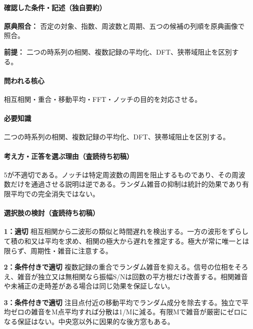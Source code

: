 \paragraph{確認した条件・記述（独自要約）}\mbox{}\par

\noindent\textbf{原典照合：} 否定の対象、指数、周波数と周期、五つの候補の列順を原典画像で照合。\par

\noindent\textbf{前提：} 二つの時系列の相関、複数記録の平均化、DFT、狭帯域阻止を区別する。\par

\paragraph{問われる核心} 相互相関・重合・移動平均・FFT・ノッチの目的を対応させる。

\paragraph{必要知識} 二つの時系列の相関、複数記録の平均化、DFT、狭帯域阻止を区別する。

\paragraph{考え方・正答を選ぶ理由（査読待ち初稿）} 5が不適切である。ノッチは特定周波数の周囲を阻止するものであり、その周波数だけを通過させる説明は逆である。ランダム雑音の抑制は統計的効果であり有限平均での完全消失ではない。

\paragraph{選択肢の検討（査読待ち初稿）}\mbox{}\par

\noindent\textbf{1：適切} 相互相関から二波形の類似と時間遅れを検出する。一方の波形をずらして積の和又は平均を求め、相関の極大から遅れを推定する。極大が常に唯一とは限らず、周期性・雑音に注意する。\par

\noindent\textbf{2：条件付きで適切} 複数記録の重合でランダム雑音を抑える。信号の位相をそろえ、雑音が独立又は無相関なら振幅S/Nは回数の平方根だけ改善する。相関雑音や未補正の走時差がある場合は同じ効果を保証しない。\par

\noindent\textbf{3：条件付きで適切} 注目点付近の移動平均でランダム成分を除去する。独立で平均ゼロの雑音をM点平均すれば分散は1/Mに減る。有限Mで雑音が厳密にゼロになる保証はない。中央窓以外に因果的な後方窓もある。\par

